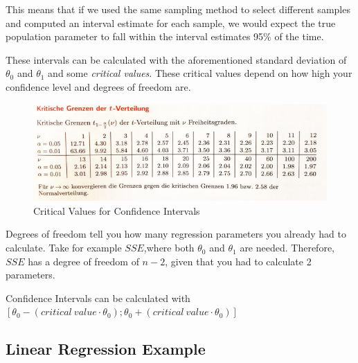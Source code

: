 \documentclass[a4paper, 11pt]{article}
\begin{document}
This means that if we used the same sampling method to select different samples and computed an interval estimate for each sample, we would expect the true population parameter to fall within the interval estimates 95\% of the time.

\vspace{10px}

These intervals can be calculated with the aforementioned standard deviation of $\theta^{}_{0}$ and $\theta^{}_{1}$ and some \textit{critical values}. These critical values depend on how high your confidence level and degrees of freedom are. 

\begin{figure}[htb!]
    \centering
    \includegraphics[keepaspectratio=true, width=\linewidth]{CriticalBordersTInterval.png}
    \caption{Critical Values for Confidence Intervals}
    \label{fig:critical_values}
\end{figure}


Degrees of freedom tell you how many regression parameters you already had to calculate. Take for example $SSE$,where both $\theta^{}_{0}$ and $\theta^{}_{1}$ are needed. Therefore, $SSE$ has a degree of freedom of $n-2$, given that you had to calculate 2 parameters.

\vspace{10px}

\noindent Confidence Intervals can be calculated with $[\theta_0 - (critical\ value \cdot \theta_0);\theta_0 + (critical\ value \cdot \theta_0)]$


\newpage

\subsection{Linear Regression Example}
\end{document}
